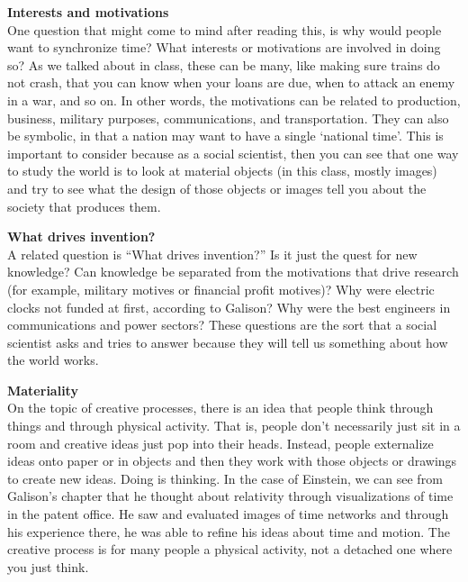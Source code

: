 \documentclass[a4paper]{article}
\begin{document}
\bigskip

\noindent\textbf{Interests and motivations}\\
One question that might come to mind after reading this, is why would people want to synchronize time? What interests or motivations are involved in doing so? As we talked about in class, these can be many, like making sure trains do not crash, that you can know when your loans are due, when to attack an enemy in a war, and so on. In other words, the motivations can be related to production, business, military purposes, communications, and transportation. They can also be symbolic, in that a nation may want to have a single `national time'. This is important to consider because as a social scientist, then you can see that one way to study the world is to look at material objects (in this class, mostly images) and try to see what the design of those objects or images tell you about the society that produces them.

\bigskip

\noindent\textbf{What drives invention?}\\
A related question is ``What drives invention?'' Is it just the quest for new knowledge? Can knowledge be separated from the motivations that drive research (for example, military motives or financial profit motives)? Why were electric clocks not funded at first, according to Galison? Why were the best engineers in communications and power sectors? These questions are the sort that a social scientist asks and tries to answer because they will tell us something about how the world works.

\bigskip

\noindent\textbf{Materiality}\\
On the topic of creative processes, there is an idea that people think through things and through physical activity. That is, people don't necessarily just sit in a room and creative ideas just pop into their heads. Instead, people externalize ideas onto paper or in objects and then they work with those objects or drawings to create new ideas. Doing is thinking. In the case of Einstein, we can see from Galison's chapter that he thought about relativity through visualizations of time in the patent office. He saw and evaluated images of time networks and through his experience there, he was able to refine his ideas about time and motion. The creative process is for many people a physical activity, not a detached one where you just think.

\bigskip
\end{document}
